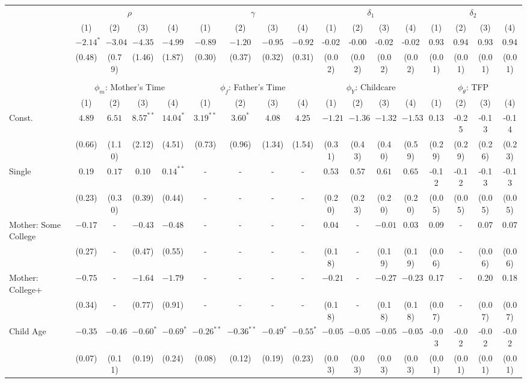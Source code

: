 \begin{tabular}{lcccccccccccccccc}\\\toprule
 & \multicolumn{4}{c}{$\rho$} & \multicolumn{4}{c}{$\gamma$} & \multicolumn{4}{c}{$\delta_{1}$} & \multicolumn{4}{c}{$\delta_{2}$} \\
&(1)&(2)&(3)&(4)&(1)&(2)&(3)&(4)&(1)&(2)&(3)&(4)&(1)&(2)&(3)&(4)\\\cmidrule(r){2-5}\cmidrule(r){6-9}\cmidrule(r){10-13}\cmidrule(r){14-17}
&$-2.14^{*}$&$-3.04$&$-4.35$&$-4.99$&$-0.89$&$-1.20$&$-0.95$&$-0.92$&-0.02&-0.00&-0.02&-0.02&0.93&0.94&0.93&0.94\\
&(0.48)&(0.79)&(1.46)&(1.87)&(0.30)&(0.37)&(0.32)&(0.31)&(0.02)&(0.02)&(0.02)&(0.02)&(0.01)&(0.01)&(0.01)&(0.01)\\
&&&&&&&&&&&&&&&&\\
 & \multicolumn{4}{c}{$\phi_{m}$: Mother's Time} & \multicolumn{4}{c}{$\phi_{f}$: Father's Time} & \multicolumn{4}{c}{$\phi_{Y}$: Childcare} & \multicolumn{4}{c}{$\phi_{\theta}$: TFP} \\
&(1)&(2)&(3)&(4)&(1)&(2)&(3)&(4)&(1)&(2)&(3)&(4)&(1)&(2)&(3)&(4)\\\cmidrule(r){2-5}\cmidrule(r){6-9}\cmidrule(r){10-13}\cmidrule(r){14-17}
Const.&$4.89$&$6.51$&$8.57^{**}$&$14.04^{*}$&$3.19^{**}$&$3.60^{*}$&$4.08$&$4.25$&$-1.21$&$-1.36$&$-1.32$&$-1.53$&0.13&-0.25&-0.13&-0.14\\
&(0.66)&(1.10)&(2.12)&(4.51)&(0.73)&(0.96)&(1.34)&(1.54)&(0.31)&(0.43)&(0.40)&(0.59)&(0.29)&(0.29)&(0.26)&(0.23)\\
Single&$0.19$&$0.17$&$0.10$&$0.14^{**}$&-&-&-&-&$0.53$&$0.57$&$0.61$&$0.65$&-0.12&-0.12&-0.13&-0.13\\
&(0.23)&(0.30)&(0.39)&(0.44)&-&-&-&-&(0.20)&(0.23)&(0.20)&(0.20)&(0.05)&(0.05)&(0.05)&(0.05)\\
Mother: Some College&$-0.17$&-&$-0.43$&$-0.48$&-&-&-&-&$0.04$&-&$-0.01$&$0.03$&0.09&-&0.07&0.07\\
&(0.27)&-&(0.47)&(0.55)&-&-&-&-&(0.18)&-&(0.19)&(0.19)&(0.06)&-&(0.06)&(0.06)\\
Mother: College+&$-0.75$&-&$-1.64$&$-1.79$&-&-&-&-&$-0.21$&-&$-0.27$&$-0.23$&0.17&-&0.20&0.18\\
&(0.34)&-&(0.77)&(0.91)&-&-&-&-&(0.18)&-&(0.18)&(0.18)&(0.07)&-&(0.07)&(0.07)\\
Child Age&$-0.35$&$-0.46$&$-0.60^{*}$&$-0.69^{*}$&$-0.26^{**}$&$-0.36^{**}$&$-0.49^{*}$&$-0.55^{*}$&$-0.05$&$-0.05$&$-0.05$&$-0.05$&-0.03&-0.02&-0.02&-0.02\\
&(0.07)&(0.11)&(0.19)&(0.24)&(0.08)&(0.12)&(0.19)&(0.23)&(0.03)&(0.03)&(0.03)&(0.03)&(0.01)&(0.01)&(0.01)&(0.01)\\

\end{tabular}
